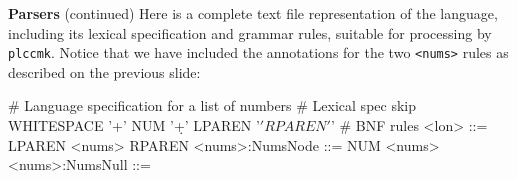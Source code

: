 \begin{minipage}[t]{\sw}
\slidenumber
\LARGE
{\bf Parsers} (continued)\exx
Here is a complete text file representation of the language,
including its lexical specification and grammar rules,
suitable for processing by \verb'plccmk'.
Notice that we have included the annotations
for the two \verb'<nums>' rules as described on the previous slide:\exx
\begin{SaveVerbatim}{\MYlonGrammar}
# Language specification for a list of numbers
# Lexical spec
skip WHITESPACE '\s+'
NUM '\d+'
LPAREN '\('
RPAREN '\)'
%
# BNF rules
<lon>           ::= LPAREN <nums> RPAREN
<nums>:NumsNode ::= NUM <nums>
<nums>:NumsNull ::= 
%
\end{SaveVerbatim}
\emm\NormalBox{\MYlonGrammar}\exx
\end{minipage}
\clearpage
